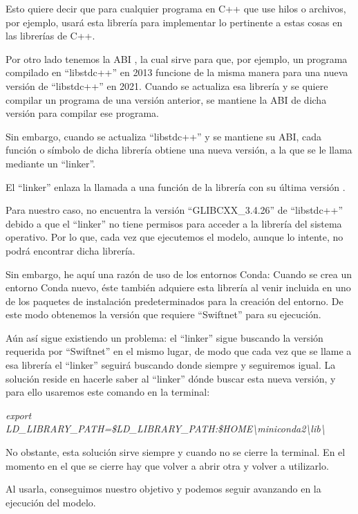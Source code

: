 Esto quiere decir que para cualquier programa en C++ que use hilos o archivos, por ejemplo, usará esta librería para implementar lo pertinente a estas cosas en las librerías de C++.

Por otro lado tenemos la \ac{ABI} \cite{glibcxx}, la cual sirve para que, por ejemplo, un programa compilado en ``libstdc++'' en 2013 funcione de la misma manera para una nueva versión de ``libstdc++'' en 2021. Cuando se actualiza esa librería y se quiere compilar un programa de una versión anterior, se mantiene la ABI de dicha versión para compilar ese programa.

Sin embargo, cuando se actualiza ``libstdc++'' y se mantiene su ABI, cada función o símbolo de dicha librería obtiene una nueva versión, a la que se le llama mediante un ``linker''.

El ``linker'' enlaza la llamada a una función de la librería con su última versión \cite{glibcxx}.

Para nuestro caso, no encuentra la versión ``GLIBCXX\_3.4.26'' de ``libstdc++'' debido a que el ``linker'' no tiene permisos para acceder a la librería del sistema operativo. Por lo que, cada vez que ejecutemos el modelo, aunque lo intente, no podrá encontrar dicha librería.

Sin embargo, he aquí una razón de uso de los entornos Conda: Cuando se crea un entorno Conda nuevo, éste también adquiere esta librería al venir incluida en uno de los paquetes de instalación predeterminados para la creación del entorno. De este modo obtenemos la versión que requiere ``Swiftnet'' para su ejecución.

Aún así sigue existiendo un problema: el ``linker'' sigue buscando la versión requerida por ``Swiftnet'' en el mismo lugar, de modo que cada vez que se llame a esa librería el ``linker'' seguirá buscando donde siempre y seguiremos igual. La solución reside en hacerle saber al ``linker'' dónde buscar esta nueva versión, y para ello usaremos este comando en la terminal:

\begin{center}
\textit{export LD\_LIBRARY\_PATH=\$LD\_LIBRARY\_PATH:\$HOME\textbackslash{miniconda2}\textbackslash{lib}\textbackslash{}}
\end{center}

No obstante, esta solución sirve siempre y cuando no se cierre la terminal. En el momento en el que se cierre hay que volver a abrir otra y volver a utilizarlo.

Al usarla, conseguimos nuestro objetivo y podemos seguir avanzando en la ejecución del modelo.

